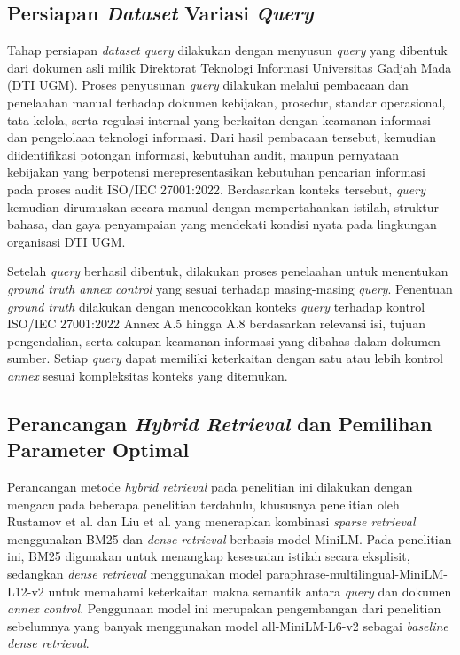 \subsection{Persiapan \textit{Dataset} Variasi \textit{Query}}

Tahap persiapan \textit{dataset query} dilakukan dengan menyusun \textit{query} yang dibentuk dari dokumen asli milik Direktorat Teknologi Informasi Universitas Gadjah Mada (DTI UGM). Proses penyusunan \textit{query} dilakukan melalui pembacaan dan penelaahan manual terhadap dokumen kebijakan, prosedur, standar operasional, tata kelola, serta regulasi internal yang berkaitan dengan keamanan informasi dan pengelolaan teknologi informasi. Dari hasil pembacaan tersebut, kemudian diidentifikasi potongan informasi, kebutuhan audit, maupun pernyataan kebijakan yang berpotensi merepresentasikan kebutuhan pencarian informasi pada proses audit ISO/IEC 27001:2022. Berdasarkan konteks tersebut, \textit{query} kemudian dirumuskan secara manual dengan mempertahankan istilah, struktur bahasa, dan gaya penyampaian yang mendekati kondisi nyata pada lingkungan organisasi DTI UGM.

Setelah \textit{query} berhasil dibentuk, dilakukan proses penelaahan untuk menentukan \textit{ground truth annex control} yang sesuai terhadap masing-masing \textit{query}. Penentuan \textit{ground truth} dilakukan dengan mencocokkan konteks \textit{query} terhadap kontrol ISO/IEC 27001:2022 Annex A.5 hingga A.8 berdasarkan relevansi isi, tujuan pengendalian, serta cakupan keamanan informasi yang dibahas dalam dokumen sumber. Setiap \textit{query} dapat memiliki keterkaitan dengan satu atau lebih kontrol \textit{annex} sesuai kompleksitas konteks yang ditemukan.

\subsection{Perancangan \textit{Hybrid Retrieval} dan Pemilihan Parameter Optimal}

Perancangan metode \textit{hybrid retrieval} pada penelitian ini dilakukan dengan mengacu pada beberapa penelitian terdahulu, khususnya penelitian oleh Rustamov et al. dan Liu et al. yang menerapkan kombinasi \textit{sparse retrieval} menggunakan BM25 dan \textit{dense retrieval} berbasis model MiniLM. Pada penelitian ini, BM25 digunakan untuk menangkap kesesuaian istilah secara eksplisit, sedangkan \textit{dense retrieval} menggunakan model paraphrase-multilingual-MiniLM-L12-v2 untuk memahami keterkaitan makna semantik antara \textit{query} dan dokumen \textit{annex control}. Penggunaan model ini merupakan pengembangan dari penelitian sebelumnya yang banyak menggunakan model all-MiniLM-L6-v2 sebagai \textit{baseline dense retrieval}.


